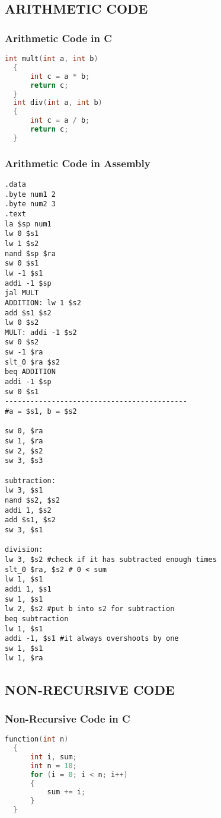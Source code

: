 \documentclass[11pt, titlepage]{article}
\begin{document}
\subsection{ARITHMETIC CODE}
\subsubsection{Arithmetic Code in C}
\begin{lstlisting}[language = C]
int mult(int a, int b)
  {
      int c = a * b;
      return c;
  }
  int div(int a, int b)
  {
      int c = a / b;
      return c;
  }
\end{lstlisting}
\subsubsection{Arithmetic Code in Assembly}
\begin{lstlisting}[language=Ant]
.data 
.byte num1 2
.byte num2 3
.text
la $sp num1
lw 0 $s1
lw 1 $s2
nand $sp $ra
sw 0 $s1
lw -1 $s1
addi -1 $sp 
jal MULT
ADDITION: lw 1 $s2	
add $s1 $s2
lw 0 $s2
MULT: addi -1 $s2
sw 0 $s2
sw -1 $ra
slt_0 $ra $s2
beq ADDITION
addi -1 $sp
sw 0 $s1
-------------------------------------------
#a = $s1, b = $s2

sw 0, $ra
sw 1, $ra
sw 2, $s2
sw 3, $s3

subtraction:
lw 3, $s1
nand $s2, $s2
addi 1, $s2
add $s1, $s2
sw 3, $s1

division:
lw 3, $s2 #check if it has subtracted enough times
slt_0 $ra, $s2 # 0 < sum
lw 1, $s1
addi 1, $s1
sw 1, $s1
lw 2, $s2 #put b into s2 for subtraction
beq subtraction
lw 1, $s1
addi -1, $s1 #it always overshoots by one
sw 1, $s1
lw 1, $ra

\end{lstlisting}
\subsection{NON-RECURSIVE CODE}
\subsubsection{Non-Recursive Code in C}
\begin{lstlisting}[language = C]
function(int n)
  {
      int i, sum;
      int n = 10;
      for (i = 0; i < n; i++)
      {
          sum += i;
      }
  }
\end{lstlisting}
\end{document}
